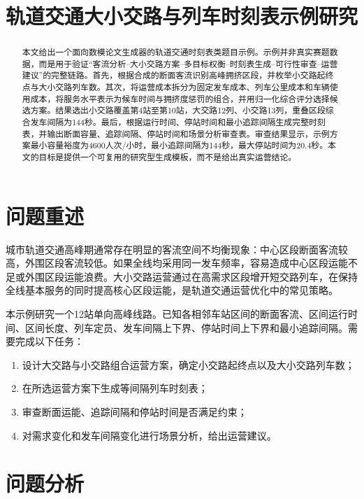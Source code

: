 \documentclass[withoutpreface]{cumcmthesis}
\title{轨道交通大小交路与列车时刻表示例研究}
\begin{document}
\maketitle

\begin{abstract}
本文给出一个面向数模论文生成器的轨道交通时刻表类题目示例。示例并非真实赛题数据，而是用于验证“客流分析--大小交路方案--多目标权衡--时刻表生成--可行性审查--运营建议”的完整链路。首先，根据合成的断面客流识别高峰拥挤区段，并枚举小交路起终点与大小交路列车数。其次，将运营成本拆分为固定发车成本、列车公里成本和车辆使用成本，将服务水平表示为候车时间与拥挤度惩罚的组合，并用归一化综合评分选择候选方案。结果选出小交路覆盖第4站至第10站，大交路12列、小交路13列，重叠区段综合发车间隔为144秒。最后，根据运行时间、停站时间和最小追踪间隔生成完整时刻表，并输出断面容量、追踪间隔、停站时间和场景分析审查表。审查结果显示，示例方案最小容量裕度为4600人次/小时，最小追踪间隔为144秒，最大停站时间为20.4秒。本文的目标是提供一个可复用的研究型生成模板，而不是给出真实运营结论。

\end{abstract}

\section{问题重述}

城市轨道交通高峰期通常存在明显的客流空间不均衡现象：中心区段断面客流较高，外围区段客流较低。如果全线均采用同一发车频率，容易造成中心区段运能不足或外围区段运能浪费。大小交路运营通过在高需求区段增开短交路列车，在保持全线基本服务的同时提高核心区段运能，是轨道交通运营优化中的常见策略。

本示例研究一个12站单向高峰线路。已知各相邻车站区间的断面客流、区间运行时间、区间长度、列车定员、发车间隔上下界、停站时间上下界和最小追踪间隔。需要完成以下任务：

\begin{enumerate}
\item 设计大交路与小交路组合运营方案，确定小交路起终点以及大小交路列车数；
\item 在所选运营方案下生成等间隔列车时刻表；
\item 审查断面运能、追踪间隔和停站时间是否满足约束；
\item 对需求变化和发车间隔变化进行场景分析，给出运营建议。
\end{enumerate}

\section{问题分析}
\end{document}
